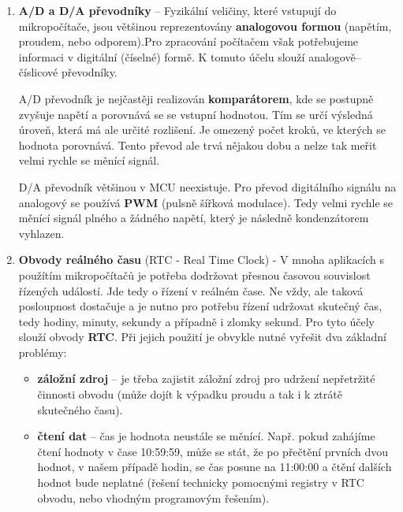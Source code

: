 \begin{enumerate}
\item \textbf{A/D a D/A převodníky} -- Fyzikální veličiny, které vstupují do mikropočítače, jsou většinou reprezentovány
\textbf{analogovou formou} (napětím, proudem, nebo odporem).Pro zpracování počítačem však potřebujeme informaci v digitální (číselné) formě. K tomuto účelu slouží analogově–číslicové převodníky.

A/D převodník je nejčastěji realizován \textbf{komparátorem}, kde se postupně zvyšuje napětí a porovnává se se vstupní hodnotou. Tím se určí výsledná úroveň, která má ale určité rozlišení. Je omezený počet kroků, ve kterých se hodnota porovnává. Tento převod ale trvá nějakou dobu a nelze tak meřit velmi rychle se měnící signál.

D/A převodník většinou v MCU neexistuje. Pro převod digitálního signálu na analogový se používá \textbf{PWM} (pulsně šířková modulace). Tedy velmi rychle se měnící signál plného a žádného napětí, který je následně kondenzátorem vyhlazen.

\item \textbf{Obvody reálného času} (RTC - Real Time Clock) - V mnoha aplikacích s použítím mikropočítačů je potřeba dodržovat přesnou časovou souvislost řízených událostí. Jde tedy o řízení v reálném čase. Ne vždy, ale taková posloupnost dostačuje a je nutno pro potřebu řízení udržovat skutečný čas, tedy hodiny, minuty, sekundy a případně i zlomky sekund. Pro tyto účely slouží obvody \textbf{RTC}. Při jejich použití je obvykle nutné vyřešit dva základní problémy:
\begin{itemize}
\item \textbf{záložní zdroj} -- je třeba zajistit záložní zdroj pro udržení nepřetržité činnosti obvodu (může dojít k výpadku proudu a tak i k ztrátě skutečného času).
\item \textbf{čtení dat} -- čas je hodnota neustále se měnící. Např. pokud zahájíme čtení hodnoty v čase 10:59:59, může se stát, že po přečtění prvních dvou hodnot, v našem případě hodin, se čas posune na 11:00:00 a čtění dalších hodnot bude neplatné (řešení technicky pomocnými registry v RTC obvodu, nebo vhodným programovým řešením). 
\end{itemize}
\end{enumerate}

